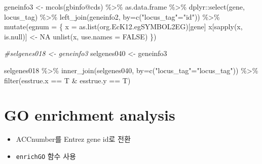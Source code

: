 \documentclass[
]{book}
\newenvironment{Shaded}{\begin{snugshade}}{\end{snugshade}}
\newcommand{\AttributeTok}[1]{\textcolor[rgb]{0.77,0.63,0.00}{#1}}
\newcommand{\CommentTok}[1]{\textcolor[rgb]{0.56,0.35,0.01}{\textit{#1}}}
\newcommand{\ConstantTok}[1]{\textcolor[rgb]{0.00,0.00,0.00}{#1}}
\newcommand{\FunctionTok}[1]{\textcolor[rgb]{0.00,0.00,0.00}{#1}}
\newcommand{\NormalTok}[1]{#1}
\newcommand{\OtherTok}[1]{\textcolor[rgb]{0.56,0.35,0.01}{#1}}
\newcommand{\SpecialCharTok}[1]{\textcolor[rgb]{0.00,0.00,0.00}{#1}}
\newcommand{\StringTok}[1]{\textcolor[rgb]{0.31,0.60,0.02}{#1}}
\providecommand{\tightlist}{%
  \setlength{\itemsep}{0pt}\setlength{\parskip}{0pt}}
\begin{document}
\begin{Shaded}
\begin{Highlighting}[]
\NormalTok{geneinfo3 }\OtherTok{\textless{}{-}} \FunctionTok{mcols}\NormalTok{(gbinfo}\SpecialCharTok{@}\NormalTok{cds) }\SpecialCharTok{\%\textgreater{}\%} 
\NormalTok{  as.data.frame }\SpecialCharTok{\%\textgreater{}\%} 
\NormalTok{  dplyr}\SpecialCharTok{::}\FunctionTok{select}\NormalTok{(gene, locus\_tag) }\SpecialCharTok{\%\textgreater{}\%} 
  \FunctionTok{left\_join}\NormalTok{(geneinfo2, }\AttributeTok{by=}\FunctionTok{c}\NormalTok{(}\StringTok{"locus\_tag"}\OtherTok{=}\StringTok{"id"}\NormalTok{)) }\SpecialCharTok{\%\textgreater{}\%} 
  \FunctionTok{mutate}\NormalTok{(}\AttributeTok{egnum =}\NormalTok{ \{}
\NormalTok{    x }\OtherTok{=} \FunctionTok{as.list}\NormalTok{(org.EcK12.egSYMBOL2EG)[gene]}
\NormalTok{    x[}\FunctionTok{sapply}\NormalTok{(x, is.null)] }\OtherTok{\textless{}{-}} \ConstantTok{NA}
    \FunctionTok{unlist}\NormalTok{(x, }\AttributeTok{use.names =} \ConstantTok{FALSE}\NormalTok{)}
\NormalTok{    \})}


\CommentTok{\#selgenes018 \textless{}{-} geneinfo3}
\NormalTok{selgenes040 }\OtherTok{\textless{}{-}}\NormalTok{ geneinfo3}

\NormalTok{selgenes018 }\SpecialCharTok{\%\textgreater{}\%} 
  \FunctionTok{inner\_join}\NormalTok{(selgenes040, }\AttributeTok{by=}\FunctionTok{c}\NormalTok{(}\StringTok{"locus\_tag"}\OtherTok{=}\StringTok{"locus\_tag"}\NormalTok{)) }\SpecialCharTok{\%\textgreater{}\%} 
  \FunctionTok{filter}\NormalTok{(esstrue.x }\SpecialCharTok{==}\NormalTok{ T }\SpecialCharTok{\&}\NormalTok{ esstrue.y }\SpecialCharTok{==}\NormalTok{ T)}
\end{Highlighting}
\end{Shaded}

\hypertarget{go-enrichment-analysis}{%
\section{GO enrichment analysis}\label{go-enrichment-analysis}}

\begin{itemize}
\tightlist
\item
  ACCnumber를 Entrez gene id로 전환
\item
  \texttt{enrichGO} 함수 사용
\end{itemize}
\end{document}
